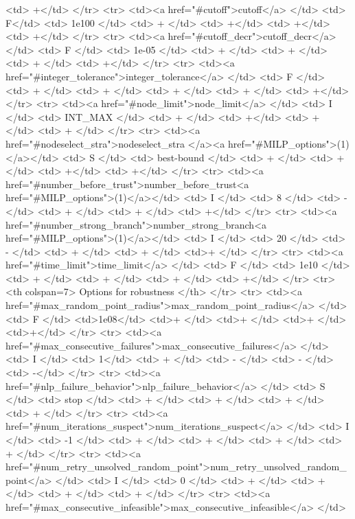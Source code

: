 {\begin{rawhtml}
    <td> +</td>
  </tr>
  <tr>
    <td><a href="#cutoff">cutoff</a> </td>
    <td> F</td>
    <td> 1e100 </td>
    <td> + </td>
    <td> +</td>
    <td> +</td>
    <td> +</td>
  </tr>
  <tr>
    <td><a href="#cutoff_decr">cutoff_decr</a> </td>
    <td> F </td>
    <td> 1e-05 </td>
    <td> + </td>
    <td> + </td>
    <td> + </td>
    <td> +</td>
  </tr>
  <tr>
    <td><a href="#integer_tolerance">integer_tolerance</a> </td>
    <td> F </td>
    <td> + </td>
    <td> + </td>
    <td> + </td>
    <td> + </td>
    <td> +</td>
  </tr>
  <tr>
    <td><a href="#node_limit">node_limit</a> </td>
    <td> I </td>
    <td> INT_MAX </td>
    <td> + </td>
    <td> +</td>
    <td> + </td>
    <td> + </td>
  </tr>
  <tr>
    <td><a href="#nodeselect_stra">nodeselect_stra </a><a href="#MILP_options">(1)</a></td>
    <td> S </td>
    <td> best-bound </td>
    <td> + </td>
    <td> + </td>
    <td> +</td>
    <td> +</td>
  </tr>
  <tr>
    <td><a href="#number_before_trust">number_before_trust<a href="#MILP_options">(1)</a></td>
    <td> I </td>
    <td> 8 </td>
    <td> - </td>
    <td> + </td>
    <td> + </td>
    <td> +</td>
  </tr>
  <tr>
    <td><a href="#number_strong_branch">number_strong_branch<a href="#MILP_options">(1)</a></td>
    <td> I </td>
    <td> 20 </td>
    <td> - </td>
    <td> + </td>
    <td> + </td>
    <td>+ </td>
  </tr>
  <tr>
    <td><a href="#time_limit">time_limit</a> </td>
    <td> F </td>
    <td> 1e10 </td>
    <td> + </td>
    <td> + </td>
    <td> + </td>
    <td> +</td>
  </tr>
  <tr>
     <th colspan=7> Options for robustness </th>
  </tr>
  <tr>
    <td><a href="#max_random_point_radius">max_random_point_radius</a> </td>
    <td> F </td>
    <td>1e08</td>
    <td>+ </td>
    <td>+ </td>
    <td>+ </td>
    <td>+</td>
  </tr>
  <tr>
    <td><a href="#max_consecutive_failures">max_consecutive_failures</a> </td>
    <td> I </td>
    <td> 1</td>
    <td> + </td>
    <td> - </td>
    <td> - </td>
    <td> -</td>
  </tr>
  <tr>
    <td><a href="#nlp_failure_behavior">nlp_failure_behavior</a> </td>
    <td> S </td>
    <td> stop </td>
    <td> + </td>
    <td> + </td>
    <td> + </td>
    <td> + </td>
  </tr>
  <tr>
    <td><a href="#num_iterations_suspect">num_iterations_suspect</a> </td>
    <td> I </td>
    <td> -1 </td>
    <td> + </td>
    <td> + </td>
    <td> + </td>
    <td> + </td>
  </tr>
  <tr>
    <td><a href="#num_retry_unsolved_random_point">num_retry_unsolved_random_point</a> </td>
    <td> I </td>
    <td> 0 </td>
    <td> + </td>
    <td> + </td>
    <td> + </td>
    <td> + </td>
  </tr>
  <tr>
    <td><a href="#max_consecutive_infeasible">max_consecutive_infeasible</a> </td>

\end{rawhtml}}
